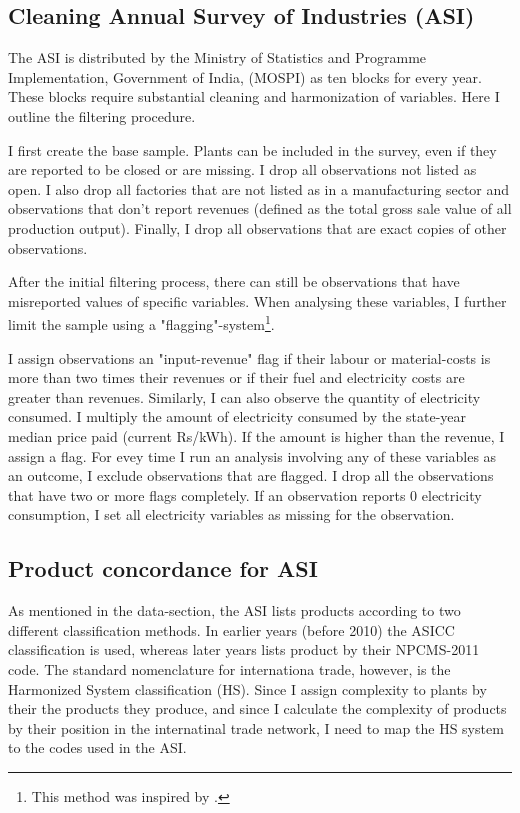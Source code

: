 \documentclass[11pt]{article}
\begin{document}
\begin{appendices}
\subsection{Cleaning Annual Survey of Industries (ASI)}%
\label{sub:cleaning_annual_survey_of_industries_asi}

The ASI is distributed by the Ministry of Statistics and Programme Implementation, Government of India, (MOSPI) as ten blocks for every year. These blocks require substantial cleaning and harmonization of variables. Here I outline the filtering procedure.

I first create the base sample. Plants can be included in the survey, even if they are reported to be closed or are missing. I drop all observations not listed as open. I also drop all factories that are not listed as in a manufacturing sector and observations that don't report revenues (defined as the total gross sale value of all production output). Finally, I drop all observations that are exact copies of other observations.

After the initial filtering process, there can still be observations that have misreported values of specific variables. When analysing these variables, I further limit the sample using a "flagging"-system\footnote{This method was inspired by \cite{allcott_how_2016}.}. 

I assign observations an "input-revenue" flag if their labour or material-costs is more than two times their revenues or if their fuel and electricity costs are greater than revenues. Similarly, I can also observe the quantity of electricity consumed. I multiply the amount of electricity consumed by the state-year median price paid (current Rs/kWh). If the amount is higher than the revenue, I assign a flag. For evey time I run an analysis involving any of these variables as an outcome, I exclude observations that are flagged. I drop all the observations that have two or more flags completely. If an observation reports 0 electricity consumption, I set all electricity variables as missing for the observation.

\subsection{Product concordance for ASI}%
\label{sub:product_concordance_asi}

As mentioned in the data-section, the ASI lists products according to two different classification methods. In earlier years (before 2010) the ASICC classification is used, whereas later years lists product by their NPCMS-2011 code. The standard nomenclature for internationa trade, however, is the Harmonized System classification (HS). Since I assign complexity to plants by their the products they produce, and since I calculate the complexity of products by their position in the internatinal trade network, I need to map the HS system to the codes used in the ASI.


\end{appendices}
\end{document}

